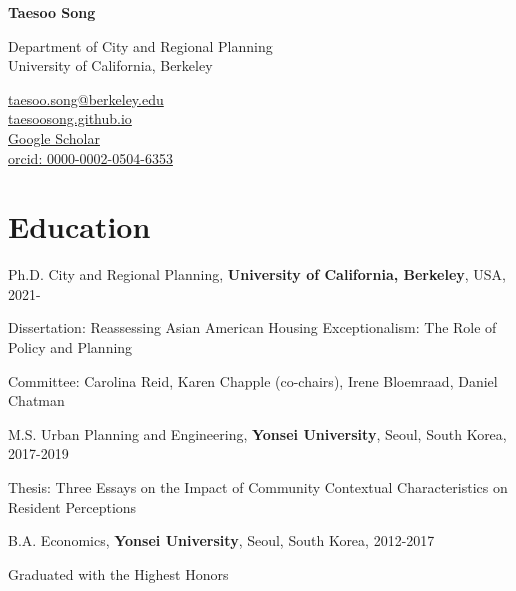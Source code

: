 \documentclass[12pt,letterpaper]{report}
\newcommand{\myname}{Taesoo Song}
\newcommand{\namefont}[1]{{\normalfont\bfseries\Huge{#1}}}
\newcommand{\listitemspace}{0.25em}
\renewenvironment{itemize}
{\begin{list}{}{\setlength{\leftmargin}{0.5em}
                \setlength{\parskip}{0em}
                \setlength{\itemsep}{\listitemspace}
                \setlength{\parsep}{\listitemspace}}}
{\end{list}}
\begin{document}
    \raggedright{}

    \namefont{\myname}

    \vspace{1em}
    \begin{minipage}[t]{0.700\textwidth}
        Department of City and Regional Planning\\
        University of California, Berkeley
    \end{minipage}
    \begin{minipage}[t]{0.295\textwidth}
        \flushright{}
        \href{mailto:taesoo.song@berkeley.edu}{taesoo.song@berkeley.edu} \\
        \href{https://taesoosong.github.io}{taesoosong.github.io}\\
        \href{https://scholar.google.com/citations?user=xM5Rc-EAAAAJ&hl=en}{Google Scholar}\\
        \href{https://orcid.org/0000-0002-0504-6353}{orcid: 0000-0002-0504-6353}
    \end{minipage}

    \section*{Education}
    
    \begin{tablist}
      \item[Ph.D.] \tab{}City and Regional Planning, \textbf{University of California, Berkeley}, USA, 2021-
      \begin{itemize}
        \item Dissertation: Reassessing Asian American Housing Exceptionalism: The Role of Policy and Planning
        \item Committee: Carolina Reid, Karen Chapple (co-chairs), Irene Bloemraad, Daniel Chatman
    \end{itemize}
      \item[M.S.] \tab{}Urban Planning and Engineering, \textbf{Yonsei University}, Seoul, South Korea, 2017-2019
      \begin{itemize}
        \item Thesis: Three Essays on the Impact of Community Contextual Characteristics on Resident Perceptions
    \end{itemize}
      \item[B.A.] \tab{}Economics, \textbf{Yonsei University}, Seoul, South Korea, 2012-2017
      \begin{itemize}
        \item Graduated with the Highest Honors
    \end{itemize}
    \end{tablist}
    
\end{document}
